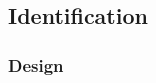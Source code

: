 \documentclass[AMA,Times1COL]{WileyNJDv5}
\begin{document}

\subsection{Identification}\label{sec:study1}


\subsubsection{Design}\label{sec:study1_design}
\end{document}
